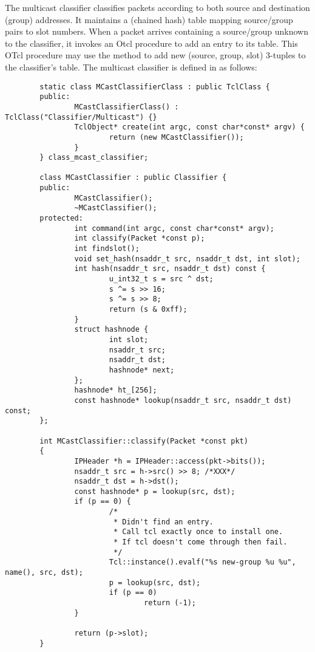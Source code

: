The multicast classifier classifies packets according to both source
and destination (group) addresses.
It maintains a (chained hash) table mapping source/group pairs to slot
numbers.
When a packet arrives containing a source/group unknown to the
classifier, it invokes an Otcl procedure  to
add an entry to its table.
This OTcl procedure may use the method  to add
new (source, group, slot) 3-tuples to the classifier's table.
The multicast classifier is defined in 
as follows:
\begin{small}
\begin{verbatim}
        static class MCastClassifierClass : public TclClass {
        public:
                MCastClassifierClass() : TclClass("Classifier/Multicast") {}
                TclObject* create(int argc, const char*const* argv) {
                        return (new MCastClassifier());
                }
        } class_mcast_classifier;

        class MCastClassifier : public Classifier {
        public:
                MCastClassifier();
                ~MCastClassifier();
        protected:
                int command(int argc, const char*const* argv);
                int classify(Packet *const p);
                int findslot();
                void set_hash(nsaddr_t src, nsaddr_t dst, int slot);
                int hash(nsaddr_t src, nsaddr_t dst) const {
                        u_int32_t s = src ^ dst;
                        s ^= s >> 16;
                        s ^= s >> 8;
                        return (s & 0xff);
                }
                struct hashnode {
                        int slot;
                        nsaddr_t src;
                        nsaddr_t dst;
                        hashnode* next;
                };
                hashnode* ht_[256];
                const hashnode* lookup(nsaddr_t src, nsaddr_t dst) const;
        };

        int MCastClassifier::classify(Packet *const pkt)
        {
                IPHeader *h = IPHeader::access(pkt->bits());
                nsaddr_t src = h->src() >> 8; /*XXX*/
                nsaddr_t dst = h->dst();
                const hashnode* p = lookup(src, dst);
                if (p == 0) {
                        /*
                         * Didn't find an entry.
                         * Call tcl exactly once to install one.
                         * If tcl doesn't come through then fail.
                         */
                        Tcl::instance().evalf("%s new-group %u %u", name(), src, dst);
                        p = lookup(src, dst);
                        if (p == 0)
                                return (-1);
                }

                return (p->slot);
        }
\end{verbatim}
\end{small}
